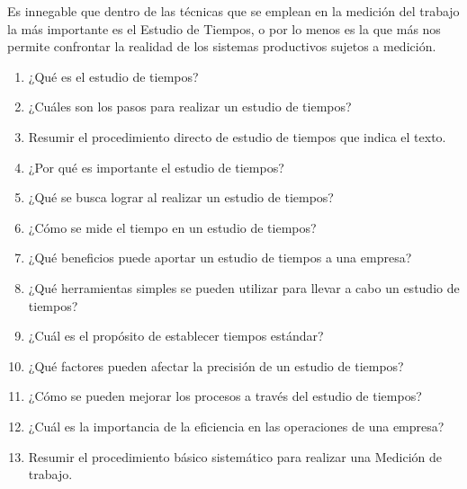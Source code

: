 \documentclass[../main]{subfiles}
\begin{document}

Es innegable que dentro de las técnicas que se emplean en la medición
del trabajo la más importante es el Estudio de Tiempos, o por lo
menos es la que más nos permite confrontar la realidad de los
sistemas productivos sujetos a medición.

\begin{enumerate}
  \item ¿Qué es el estudio de tiempos?
  \item ¿Cuáles son los pasos para realizar un estudio de tiempos?
  \item Resumir el procedimiento directo de estudio de tiempos que
    indica el texto.
  \item ¿Por qué es importante el estudio de tiempos?
  \item ¿Qué se busca lograr al realizar un estudio de tiempos?
  \item ¿Cómo se mide el tiempo en un estudio de tiempos?
  \item ¿Qué beneficios puede aportar un estudio de tiempos a una empresa?
  \item ¿Qué herramientas simples se pueden utilizar para llevar a
    cabo un estudio de tiempos?
  \item ¿Cuál es el propósito de establecer tiempos estándar?
  \item ¿Qué factores pueden afectar la precisión de un estudio de tiempos?
  \item ¿Cómo se pueden mejorar los procesos a través del estudio de tiempos?
  \item ¿Cuál es la importancia de la eficiencia en las operaciones
    de una empresa?
  \item Resumir el procedimiento básico sistemático para realizar una
    Medición de trabajo.
\end{enumerate}
\end{document}
